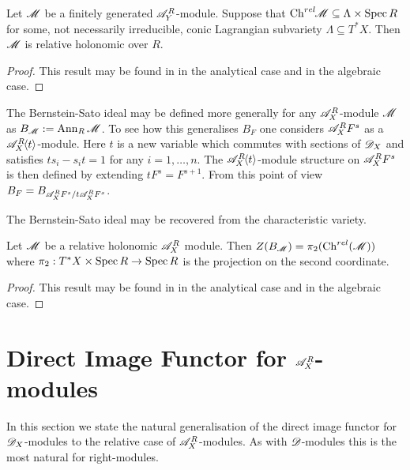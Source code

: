 \begin{lemma}\label{lem: InclusionCharVar}
  Let $\mathscr{M}$ be a finitely generated $\mathscr{A}_Y^R$-module. Suppose that $\operatorname{Ch}^{rel}\mkern-5mu \mathscr{M} \subseteq \Lambda \times \operatorname{Spec} R$ for some, not necessarily irreducible, conic Lagrangian subvariety $\Lambda\subseteq T^*X$. Then $\mathscr{M}$ is relative holonomic over $R$.
\end{lemma}
\begin{proof}
  This result may be found in \cite{maisonobe2016filtration} in the analytical case and \cite{budur2019zero} in the algebraic case.
\end{proof}
The Bernstein-Sato ideal may be defined more generally for any $\mathscr{A}_X^R$-module $\mathscr{M}$ as $B_{\mathscr{M}} := \operatorname{Ann}_{R}\mathscr{M}$. To see how this generalises $B_F$ one considers $\mathscr{A}_X^R F^s$ as a $\mathscr{A}_X^R\mkern-5mu\left\langle t \right\rangle$-module.
Here $t$ is a new variable which commutes with sections of $\mathscr{D}_X$ and satisfies $ts_i - s_it = 1$ for any $i=1,\ldots, n$.  The $\mathscr{A}_X^R\mkern-5mu\left\langle t \right\rangle$-module structure on $\mathscr{A}_X^R F^s$ is then defined by extending $tF^s = F^{s + 1}$. From this point of view $B_F = B_{\mathscr{A}_X^R F^s / t\mathscr{A}_X^R F^s}$.

The Bernstein-Sato ideal may be recovered from the characteristic variety.
\begin{proposition}\label{prop: ProjectionBernsteinSatoRelativeChar}
  Let $\mathscr{M}$ be a relative holonomic $\mathscr{A}_X^R$ module. Then  $Z(B_{\mathscr{M}}) = \pi_2(\operatorname{Ch}^{rel}(\mathscr{M}))$ where $\pi_2:T^*X\times \operatorname{Spec} R \to \operatorname{Spec} R$ is the projection on the second coordinate.
\end{proposition}
\begin{proof}
  This result may be found in \cite{maisonobe2016filtration} in the analytical case and \cite{budur2019zero} in the algebraic case.
\end{proof}
\section{Direct Image Functor for $\mathscr{A}_X^R$-modules}
    In this section we state the natural generalisation of the direct image functor for $\mathscr{D}_X$-modules to the relative case of $\mathscr{A}_X^R$-modules. As with $\mathscr{D}$-modules this is the most natural for right-modules.

